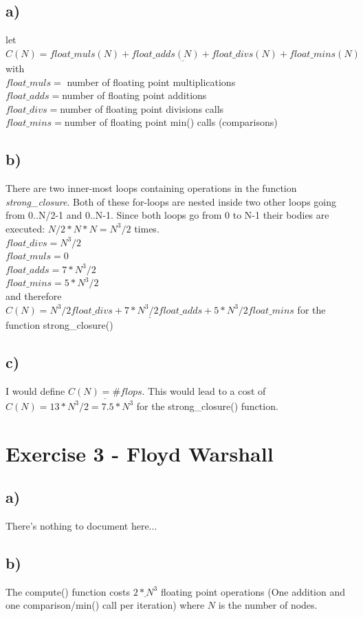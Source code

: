 \documentclass[10pt,a4paper,oneside,notitlepage]{report}
\begin{document}
\subsection*{a)}
let $\underline{C(N) = float\_muls(N) + float\_adds (N) + float\_divs(N) + float\_mins(N)}$ \\ with \\
$float\_muls = $ number of floating point multiplications \\
$float\_adds = $number of floating point additions \\
$float\_divs = $number of floating point divisions calls \\
$float\_mins = $number of floating point min() calls (comparisons) \\

\subsection*{b)}
There are two inner-most loops containing operations in the function \textit{strong\_closure}. Both of these for-loops are nested inside two other loops going from 0..N/2-1 and 0..N-1. Since both loops go from 0 to N-1 their bodies are executed: $N/2 * N * N = N^3/2$ times.
\\
$float\_divs = N^3/2$ \\
$float\_muls = 0$ \\
$float\_adds = 7*N^3/2$ \\
$float\_mins = 5*N^3/2$\\
and therefore $\underline{C(N) = N^3/2 float\_divs + 7*N^3/2 float\_adds + 5*N^3/2 float\_mins}$ for the function strong\_closure()

\subsection*{c)}
I would define $\underline{C(N) = {\#flops}}$. This would lead to a cost of $C(N) = 13*N^3/2 = 7.5*N^3$ for the strong\_closure() function.

\section*{Exercise 3 - Floyd Warshall}
\subsection*{a)}
There's nothing to document here...
\subsection*{b)}
The compute() function costs $\underline{2*N^3}$ floating point operations (One addition and one comparison/min() call per iteration) where $N$ is the number of nodes.
\end{document}
